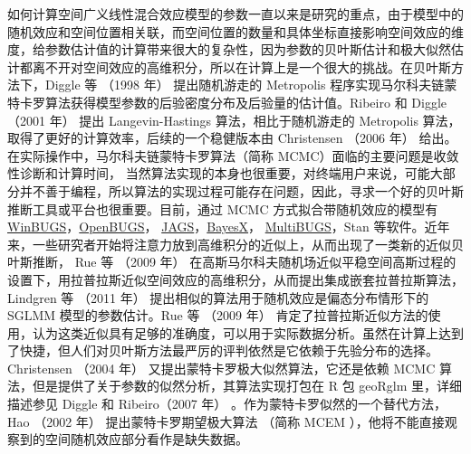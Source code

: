 \documentclass[12pt,a4paper,UTF8,twoside]{book}
\theoremstyle{definition}
\theoremstyle{definition}
\theoremstyle{definition}
\theoremstyle{remark}
\begin{document}
如何计算空间广义线性混合效应模型的参数一直以来是研究的重点，由于模型中的随机效应和空间位置相关联，而空间位置的数量和具体坐标直接影响空间效应的维度，给参数估计值的计算带来很大的复杂性，因为参数的贝叶斯估计和极大似然估计都离不开对空间效应的高维积分，所以在计算上是一个很大的挑战。在贝叶斯方法下，Diggle 等 （1998 年） \citep{Diggle1998} 提出随机游走的 Metropolis 程序实现马尔科夫链蒙特卡罗算法获得模型参数的后验密度分布及后验量的估计值。Ribeiro 和 Diggle （2001 年） \citep{geoR2001} 提出 Langevin-Hastings 算法，相比于随机游走的 Metropolis 算法，取得了更好的计算效率，后续的一个稳健版本由 Christensen （2006 年） \citep{Christensen2006} 给出。在实际操作中，马尔科夫链蒙特卡罗算法（简称 MCMC）面临的主要问题是收敛性诊断和计算时间， 当然算法实现的本身也很重要，对终端用户来说，可能大部分并不善于编程，所以算法的实现过程可能存在问题，因此，寻求一个好的贝叶斯推断工具或平台也很重要。目前，通过 MCMC 方式拟合带随机效应的模型有 \href{http://www.mrc-bsu.cam.ac.uk/software/bugs/the-bugs-project-winbugs/}{WinBUGS}，\href{http://www.openbugs.net/}{OpenBUGS}， \href{http://mcmc-jags.sourceforge.net/}{JAGS}，\href{http://www.BayesX.org}{BayesX}， \href{https://www.multibugs.org}{MultiBUGS}，Stan \citep{Stan2017JSS} 等软件。近年来，一些研究者开始将注意力放到高维积分的近似上，从而出现了一类新的近似贝叶斯推断， Rue 等 （2009 年） \citep{Rue2009} 在高斯马尔科夫随机场近似平稳空间高斯过程的设置下，用拉普拉斯近似空间效应的高维积分，从而提出集成嵌套拉普拉斯算法，Lindgren 等 （2011 年） \citep{Lindgren2011} 提出相似的算法用于随机效应是偏态分布情形下的 SGLMM 模型的参数估计。Rue 等 （2009 年） \citep{Rue2009} 肯定了拉普拉斯近似方法的使用，认为这类近似具有足够的准确度，可以用于实际数据分析。虽然在计算上达到了快捷，但人们对贝叶斯方法最严厉的评判依然是它依赖于先验分布的选择。 Christensen （2004 年） \citep{Christensen2004} 又提出蒙特卡罗极大似然算法，它还是依赖 MCMC 算法，但是提供了关于参数的似然分析，其算法实现打包在 R 包 geoRglm 里，详细描述参见 Diggle 和 Ribeiro（2007 年） \citep{Diggle2007}。作为蒙特卡罗似然的一个替代方法， Hao （2002 年）\citep{Zhang2002On} 提出蒙特卡罗期望极大算法 （简称 MCEM ），他将不能直接观察到的空间随机效应部分看作是缺失数据。
\end{document}
